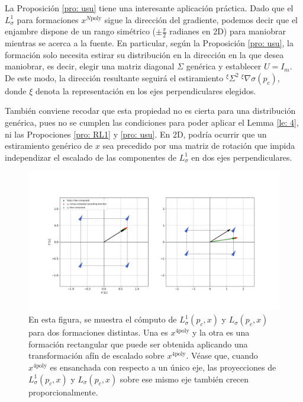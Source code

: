La Proposición \ref{pro: usu} tiene una interesante aplicación práctica. Dado que el $L^1_\sigma$ para formaciones $x^{N\text{poly}}$ sigue la dirección del gradiente, podemos decir que el enjambre dispone de un rango simétrico ($\pm \frac{\pi}{2}$ radianes en 2D) para maniobrar mientras se acerca a la fuente. En particular, según la Proposición \ref{pro: usu}, la formación solo necesita estirar su distribución en la dirección en la que desea maniobrar, es decir, elegir una matriz diagonal $\Sigma$ genérica y establecer $U = I_m$. De este modo, la dirección resultante seguirá el estiramiento ${^\xi\Sigma^2}\;{^\xi\nabla\sigma(p_c)}$, donde $\xi$ denota la representación en los ejes perpendiculares elegidos. 

También conviene recodar que esta propiedad no es cierta para una distribución genérica, pues no se cumplen las condiciones para poder aplicar el Lemma \ref{le: 4}, ni las Propociones \ref{pro: RL1} y \ref{pro: usu}. En 2D, podría ocurrir que un estiramiento genérico de $x$ sea precedido por una matriz de rotación que impida independizar el escalado de las componentes de $L^1_\sigma$ en dos ejes perpendiculares.

\newpage

\begin{figure}[!h]
\centering
\includegraphics[trim={0 0 0 0}, clip, width=0.85
\columnwidth]{./fig/prop4.png}
\caption{En esta figura, se muestra el cómputo de $L^1_\sigma(p_c, x)$ y $L_\sigma(p_c, x)$ para dos formaciones distintas. Una es $x^{4\text{poly}}$ y la otra es una formación rectangular que puede ser obtenida aplicando una transformación afín de escalado sobre $x^{4\text{poly}}$. Véase que, cuando $x^{4\text{poly}}$ es ensanchada con respecto a un único eje, las proyecciones de $L^1_\sigma(p_c, x)$ y $L_\sigma(p_c, x)$ sobre ese mismo eje también crecen proporcionalmente.}
\label{fig: ss_prop4}
\end{figure} 

